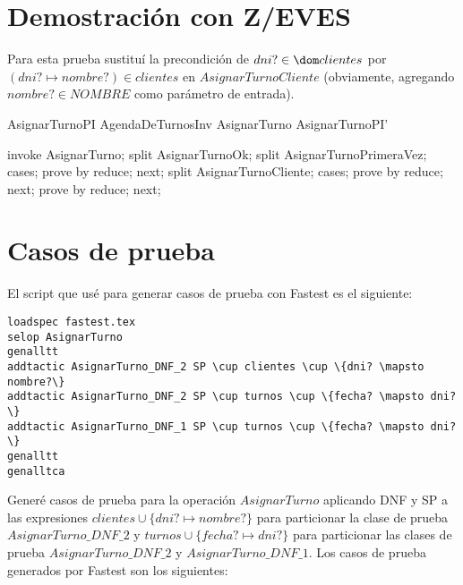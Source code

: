 \documentclass[%
  fleqn,colorlinks,linkcolor=blue,citecolor=blue,urlcolor=blue]{eptcs}
\begin{document}
\section{Demostraci\'on con Z/EVES}
Para esta prueba sustitu\'i{} la precondici\'on de $dni? \in \dom clientes$
por $(dni? \mapsto nombre?) \in clientes$ en $AsignarTurnoCliente$ (obviamente,
agregando $nombre? \in NOMBRE$ como par\'ametro de entrada).


\begin{theorem}{AsignarTurnoPI}
AgendaDeTurnosInv \land AsignarTurno \implies AsignarTurnoPI'
\end{theorem}

\begin{zproof}[AsignarTurnoPI]
invoke AsignarTurno;
split AsignarTurnoOk;
split AsignarTurnoPrimeraVez;
cases;
prove by reduce;
next;
split AsignarTurnoCliente;
cases;
prove by reduce;
next;
prove by reduce;
next;
\end{zproof}


\section{Casos de prueba}
El script que us\'e para generar casos de prueba con Fastest es el siguiente:
\begin{verbatim}
loadspec fastest.tex
selop AsignarTurno
genalltt
addtactic AsignarTurno_DNF_2 SP \cup clientes \cup \{dni? \mapsto nombre?\}
addtactic AsignarTurno_DNF_2 SP \cup turnos \cup \{fecha? \mapsto dni?\}
addtactic AsignarTurno_DNF_1 SP \cup turnos \cup \{fecha? \mapsto dni?\}
genalltt
genalltca
\end{verbatim}

Gener\'e casos de prueba para la operaci\'on $AsignarTurno$ aplicando DNF y SP a las
expresiones $clientes \cup \{dni? \mapsto nombre?\}$ para particionar la clase
de prueba $AsignarTurno\_DNF\_2$ y $turnos \cup \{fecha? \mapsto dni?\}$
para particionar las clases de prueba $AsignarTurno\_DNF\_2$ y $AsignarTurno\_DNF\_1$.
Los casos de prueba generados por Fastest son los siguientes:
\end{document}

